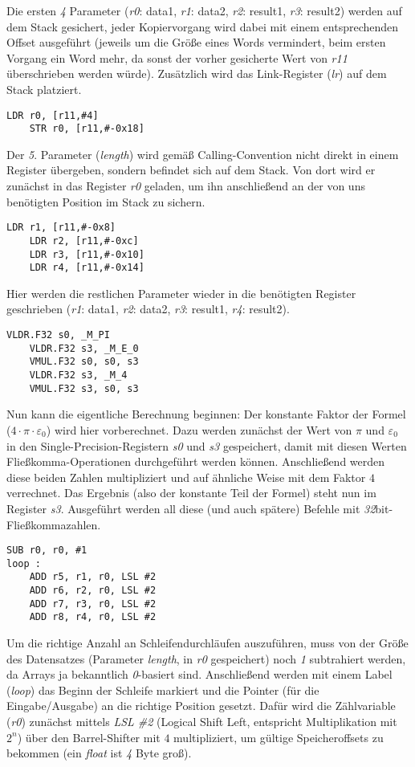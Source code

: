 \documentclass[11pt]{scrartcl}
\begin{document}
Die ersten \emph{4} Parameter (\emph{r0}: data1, \emph{r1}: data2, \emph{r2}: result1, \emph{r3}: result2) werden auf dem Stack gesichert, jeder Kopiervorgang wird dabei mit einem entsprechenden Offset ausgeführt (jeweils um die Größe eines Words vermindert, beim ersten Vorgang ein Word mehr, da sonst der vorher gesicherte Wert von \emph{r11} überschrieben werden würde). Zusätzlich wird das Link-Register (\emph{lr}) auf dem Stack platziert.
\begin{lstlisting}[language={[x86masm]Assembler}]
	LDR r0, [r11,#4]
	STR r0, [r11,#-0x18]
\end{lstlisting}
Der \emph{5}. Parameter (\emph{length}) wird gemäß Calling-Convention nicht direkt in einem Register übergeben, sondern befindet sich auf dem Stack. Von dort wird er zunächst in das Register \emph{r0} geladen, um ihn anschließend an der von uns benötigten Position im Stack zu sichern.
\begin{lstlisting}[language={[x86masm]Assembler}]
	LDR r1, [r11,#-0x8]
	LDR r2, [r11,#-0xc]
	LDR r3, [r11,#-0x10]
	LDR r4, [r11,#-0x14]
\end{lstlisting}
Hier werden die restlichen Parameter wieder in die benötigten Register geschrieben (\emph{r1}: data1, \emph{r2}: data2, \emph{r3}: result1, \emph{r4}: result2).
\begin{lstlisting}[language={[x86masm]Assembler}]
	VLDR.F32 s0, _M_PI
	VLDR.F32 s3, _M_E_0
	VMUL.F32 s0, s0, s3
	VLDR.F32 s3, _M_4
	VMUL.F32 s3, s0, s3
\end{lstlisting}
Nun kann die eigentliche Berechnung beginnen: Der konstante Faktor der Formel ($4 \cdot \pi \cdot \varepsilon_{0}$) wird hier vorberechnet. Dazu werden zunächst der Wert von $\pi$ und $\varepsilon_{0}$ in den Single-Precision-Registern \emph{s0} und \emph{s3} gespeichert, damit mit diesen Werten Fließkomma-Operationen durchgeführt werden können. Anschließend werden diese beiden Zahlen multipliziert und auf ähnliche Weise mit dem Faktor $4$ verrechnet. Das Ergebnis (also der konstante Teil der Formel) steht nun im Register \emph{s3}. Ausgeführt werden all diese (und auch spätere) Befehle mit \emph{32}bit-Fließkommazahlen.
\begin{lstlisting}[language={[x86masm]Assembler}]
	SUB r0, r0, #1
loop :
	ADD r5, r1, r0, LSL #2
	ADD r6, r2, r0, LSL #2
	ADD r7, r3, r0, LSL #2
	ADD r8, r4, r0, LSL #2
\end{lstlisting}
Um die richtige Anzahl an Schleifendurchläufen auszuführen, muss von der Größe des Datensatzes (Parameter \emph{length}, in \emph{r0} gespeichert) noch \emph{1} subtrahiert werden, da Arrays ja bekanntlich \emph{0}-basiert sind. Anschließend werden mit einem Label (\emph{loop}) das Beginn der Schleife markiert und die Pointer (für die Eingabe/Ausgabe) an die richtige Position gesetzt. Dafür wird die Zählvariable (\emph{r0}) zunächst mittels \emph{LSL \#2} (Logical Shift Left, entspricht Multiplikation mit $2^{n}$) über den Barrel-Shifter mit $4$ multipliziert, um gültige Speicheroffsets zu bekommen (ein \emph{float} ist \emph{4} Byte groß).
\end{document}
